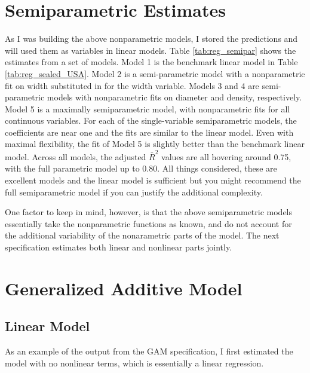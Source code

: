  

\pagebreak
\section{Semiparametric Estimates}

As I was building the above nonparametric models, 
I stored the predictions and will used them as variables in 
linear models. 
Table \ref{tab:reg_semipar} 
shows the estimates from a set of models. 
Model 1 is the benchmark linear model in 
Table \ref{tab:reg_sealed_USA}. 
Model 2 is a semi-parametric model
with a nonparametric fit on width
substituted in for the width variable.
Models 3 and 4 are semi-parametric models
with nonparametric fits on diameter and density, respectively.
Model 5 is a maximally semiparametric model, 
with nonparametric fits for all continuous variables. 
For each of the single-variable semiparametric models, 
the coefficients are near one
and the fits are similar to the linear model. 
Even with maximal flexibility, the fit of Model 5
is slightly better than the benchmark linear model. 
Across all models, the adjusted $\bar{R}^2$ values are all hovering around 0.75, 
with the full parametric model up to 0.80. 
All things considered, these are excellent models
and the linear model is sufficient
but you might recommend the full semiparametric model
if you can justify the additional complexity.

One factor to keep in mind, however,
is that the above semiparametric models
essentially take the nonparametric functions as known, 
and do not account for the additional variability of
the nonarametric parts of the model.
The next specification estimates both linear 
and nonlinear parts jointly. 




\pagebreak
\section{Generalized Additive Model}

\subsection{Linear Model}

As an example of the output from the GAM specification, 
I first estimated the model with no nonlinear terms, 
which is essentially a linear regression. 



